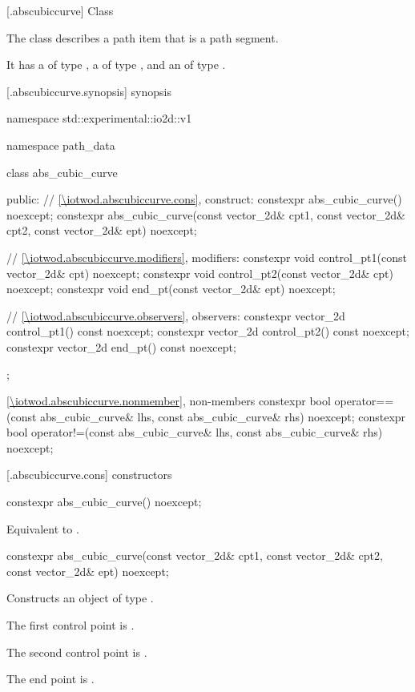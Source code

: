  [\iotwod.abscubiccurve] {Class }

\pnum
{}%
The class  describes a path item that is a path segment.

\pnum
It has a  of type , a  of type , and an  of type .

 [\iotwod.abscubiccurve.synopsis] { synopsis}

\begin{codeblock}
namespace std::experimental::io2d::v1 {
  namespace path_data {
    class abs_cubic_curve {
    public:
      // \ref{\iotwod.abscubiccurve.cons}, construct:
      constexpr abs_cubic_curve() noexcept;
      constexpr abs_cubic_curve(const vector_2d& cpt1, const vector_2d& cpt2,
        const vector_2d& ept) noexcept;

      // \ref{\iotwod.abscubiccurve.modifiers}, modifiers:
      constexpr void control_pt1(const vector_2d& cpt) noexcept;
      constexpr void control_pt2(const vector_2d& cpt) noexcept;
      constexpr void end_pt(const vector_2d& ept) noexcept;

      // \ref{\iotwod.abscubiccurve.observers}, observers:
      constexpr vector_2d control_pt1() const noexcept;
      constexpr vector_2d control_pt2() const noexcept;
      constexpr vector_2d end_pt() const noexcept;
    };
    
    \ref{\iotwod.abscubiccurve.nonmember}, non-members
    constexpr bool operator==(const abs_cubic_curve& lhs,
      const abs_cubic_curve& rhs) noexcept;
    constexpr bool operator!=(const abs_cubic_curve& lhs,
      const abs_cubic_curve& rhs) noexcept;
  }
}
\end{codeblock}

 [\iotwod.abscubiccurve.cons] { constructors}

%
\begin{itemdecl}
constexpr abs_cubic_curve() noexcept;
\end{itemdecl}
\begin{itemdescr}
\pnum
\effects
Equivalent to .
\end{itemdescr}

%
\begin{itemdecl}
constexpr abs_cubic_curve(const vector_2d& cpt1, const vector_2d& cpt2,
  const vector_2d& ept) noexcept;
\end{itemdecl}
\begin{itemdescr}
\pnum
\effects
Constructs an object of type .

\pnum
The first control point is .

\pnum
The second control point is .

\pnum
The end point is .
\end{itemdescr}

